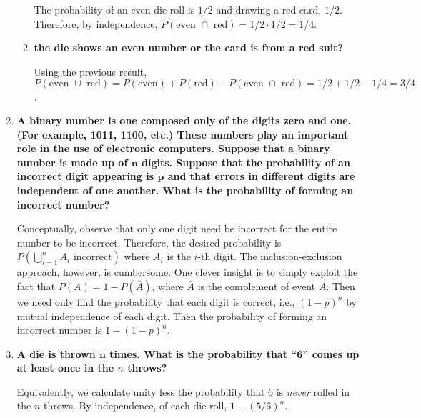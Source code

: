 \documentclass[10pt, oneside]{article}   	%
\theoremstyle{definition}
\begin{document}
\begin{enumerate}[label=3.\arabic*]
\begin{enumerate}
	The probability of an even die roll is $1/2$ and drawing a red card, $1/2$. Therefore, by independence, $P(\text{even } \cap \text{ red}) = 1/2 \cdot 1/2 = \boxed{1/4}$.
	
	\item  \begin{tcolorbox}[
	  colback=Cerulean!5!white,
	  colframe=Cerulean!75!black]
	\textbf{the die shows an even number or the card is from a red suit?}
	\end{tcolorbox}
	
	Using the previous result, $P(\text{even } \cup \text{ red}) = P(\text{even}) + P(\text{red}) - P(\text{even } \cap \text{ red}) = 1/2 + 1/2 - 1/4 = \boxed{3/4}$.
	\end{enumerate}

\item  \begin{tcolorbox}[
  colback=Cerulean!5!white,
  colframe=Cerulean!75!black]
\textbf{A binary number is one composed only of the digits zero and one. (For example, 1011, 1100, etc.) These numbers play an important role in the use of electronic computers. Suppose that a binary number is made up of $\bm{n}$ digits. Suppose that the probability of an incorrect digit appearing is $\bm{p}$ and that errors in different digits are independent of one another. What is the probability of forming an incorrect number?}
\end{tcolorbox}

Conceptually, observe that only one digit need be incorrect for the entire number to be incorrect. Therefore, the desired probability is $P(\bigcup^n_{i=1} A_i \text{ incorrect})$ where $A_i$ is the $i$-th digit. The inclusion-exclusion approach, however, is cumbersome. One clever insight is to simply exploit the fact that $P(A) = 1 - P(\bar{A})$, where $\bar{A}$ is the complement of event $A$. Then we need only find the probability that each digit is correct, i.e., $(1-p)^n$ by mutual independence of each digit. Then the probability of forming an incorrect number is $\boxed{1 - (1-p)^n}$.

\item  \begin{tcolorbox}[
  colback=Cerulean!5!white,
  colframe=Cerulean!75!black]
\textbf{A die is thrown $\bm{n}$ times. What is the probability that ``6'' comes up at least once in the $n$ throws?}
\end{tcolorbox}

Equivalently, we calculate unity less the probability that 6 is \textit{never} rolled in the $n$ throws. By independence, of each die roll, $\boxed{1 - (5/6)^n}$.


\end{enumerate}
\end{document}
